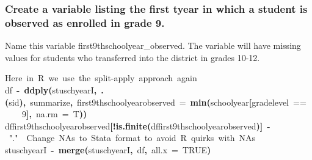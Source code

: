 \documentclass[12pt]{article}
\makeatletter
\newcommand{\hlnumber}[1]{\textcolor[rgb]{0,0,0}{#1}}%
\newcommand{\hlfunctioncall}[1]{\textcolor[rgb]{0.501960784313725,0,0.329411764705882}{\textbf{#1}}}%
\newcommand{\hlstring}[1]{\textcolor[rgb]{0.6,0.6,1}{#1}}%
\newcommand{\hlkeyword}[1]{\textcolor[rgb]{0,0,0}{\textbf{#1}}}%
\newcommand{\hlargument}[1]{\textcolor[rgb]{0.690196078431373,0.250980392156863,0.0196078431372549}{#1}}%
\newcommand{\hlcomment}[1]{\textcolor[rgb]{0.180392156862745,0.6,0.341176470588235}{#1}}%
\newcommand{\hlassignement}[1]{\textcolor[rgb]{0,0,0}{\textbf{#1}}}%
\newcommand{\hlsymbol}[1]{\textcolor[rgb]{0,0,0}{#1}}%
\newcommand{\hlstd}[1]{\textcolor[rgb]{0,0,0}{#1}}%
\newenvironment{kframe}{%
 \def\FrameCommand##1{\hskip\@totalleftmargin \hskip-\fboxsep
 \colorbox{shadecolor}{##1}\hskip-\fboxsep
     \hskip-\linewidth \hskip-\@totalleftmargin \hskip\columnwidth}%
 \MakeFramed {\advance\hsize-\width
   \@totalleftmargin\z@ \linewidth\hsize
   \@setminipage}}%
 {\par\unskip\endMakeFramed}
\newenvironment{knitrout}{}{} %
\renewenvironment{knitrout}{\begin{footnotesize}}{\end{footnotesize}}
\makeatother
\begin{document}
\subsubsection{Create a variable listing the first tyear in which a student is observed as enrolled in grade 9.}
Name this variable first9thschoolyear\_observed. The variable will have missing values for students who transferred into the district in 
grades 10-12.
\begin{knitrout}
\color{fgcolor}\begin{kframe}
\begin{flushleft}
\ttfamily\noindent
\hlcomment{\usebox{\hlnormalsizeboxhash}{\ }Here{\ }in{\ }R{\ }we{\ }use{\ }the{\ }split-apply{\ }approach{\ }again}\hspace*{\fill}\\
\hlstd{}\hlsymbol{df}{\ }\hlassignement{\usebox{\hlnormalsizeboxlessthan}-}{\ }\hlfunctioncall{ddply}\hlkeyword{(}\hlsymbol{stuschyearI}\hlkeyword{,}{\ }\hlfunctioncall{.}\hlkeyword{(}\hlsymbol{sid}\hlkeyword{)}\hlkeyword{,}{\ }\hlsymbol{summarize}\hlkeyword{,}{\ }\hlargument{first9thschoolyear\usebox{\hlnormalsizeboxunderscore}observed}{\ }\hlargument{=}{\ }\hlfunctioncall{min}\hlkeyword{(}\hlsymbol{school\usebox{\hlnormalsizeboxunderscore}year}\hlkeyword{[}\hlsymbol{grade\usebox{\hlnormalsizeboxunderscore}level}{\ }==\hspace*{\fill}\\
\hlstd{}{\ }{\ }{\ }{\ }\hlnumber{9}\hlkeyword{]}\hlkeyword{,}{\ }\hlargument{na.rm}{\ }\hlargument{=}{\ }\hlsymbol{T}\hlkeyword{)}\hlkeyword{)}\hspace*{\fill}\\
\hlstd{}\hlsymbol{df}\hlkeyword{\usebox{\hlnormalsizeboxdollar}}\hlsymbol{first9thschoolyear\usebox{\hlnormalsizeboxunderscore}observed}\hlkeyword{[}\hlkeyword{!}\hlfunctioncall{is.finite}\hlkeyword{(}\hlsymbol{df}\hlkeyword{\usebox{\hlnormalsizeboxdollar}}\hlsymbol{first9thschoolyear\usebox{\hlnormalsizeboxunderscore}observed}\hlkeyword{)}\hlkeyword{]}{\ }\hlassignement{\usebox{\hlnormalsizeboxlessthan}-}{\ }\hlstring{"{}."{}}{\ }{\ }\hlcomment{\usebox{\hlnormalsizeboxhash}Change{\ }NAs{\ }to{\ }Stata{\ }format{\ }to{\ }avoid{\ }R{\ }quirks{\ }with{\ }NAs}\hspace*{\fill}\\
\hlstd{}\hlsymbol{stuschyearI}{\ }\hlassignement{\usebox{\hlnormalsizeboxlessthan}-}{\ }\hlfunctioncall{merge}\hlkeyword{(}\hlsymbol{stuschyearI}\hlkeyword{,}{\ }\hlsymbol{df}\hlkeyword{,}{\ }\hlargument{all.x}{\ }\hlargument{=}{\ }\hlnumber{TRUE}\hlkeyword{)}\hspace*{\fill}\\

\end{flushleft}
\end{kframe}
\end{knitrout}
\end{document}
